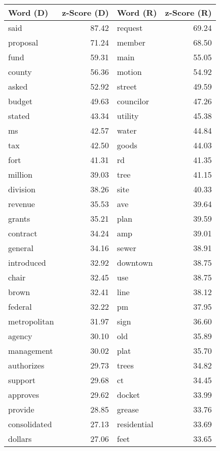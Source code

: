 \begin{table}[ht]
\centering
\begingroup\fontsize{9pt}{10pt}\selectfont
\begin{tabular}{lrlr}
  \hline
Word (D) & z-Score (D) & Word (R) & z-Score (R) \\ 
  \hline
said & 87.42 & request & 69.24 \\ 
  proposal & 71.24 & member & 68.50 \\ 
  fund & 59.31 & main & 55.05 \\ 
  county & 56.36 & motion & 54.92 \\ 
  asked & 52.92 & street & 49.59 \\ 
  budget & 49.63 & councilor & 47.26 \\ 
  stated & 43.34 & utility & 45.38 \\ 
  ms & 42.57 & water & 44.84 \\ 
  tax & 42.50 & goods & 44.03 \\ 
  fort & 41.31 & rd & 41.35 \\ 
  million & 39.03 & tree & 41.15 \\ 
  division & 38.26 & site & 40.33 \\ 
  revenue & 35.53 & ave & 39.64 \\ 
  grants & 35.21 & plan & 39.59 \\ 
  contract & 34.24 & amp & 39.01 \\ 
  general & 34.16 & sewer & 38.91 \\ 
  introduced & 32.92 & downtown & 38.75 \\ 
  chair & 32.45 & use & 38.75 \\ 
  brown & 32.41 & line & 38.12 \\ 
  federal & 32.22 & pm & 37.95 \\ 
  metropolitan & 31.97 & sign & 36.60 \\ 
  agency & 30.10 & old & 35.89 \\ 
  management & 30.02 & plat & 35.70 \\ 
  authorizes & 29.73 & trees & 34.82 \\ 
  support & 29.68 & ct & 34.45 \\ 
  approves & 29.62 & docket & 33.99 \\ 
  provide & 28.85 & grease & 33.76 \\ 
  consolidated & 27.13 & residential & 33.69 \\ 
  dollars & 27.06 & feet & 33.65 \\ 

\end{tabular}
\end{table}
